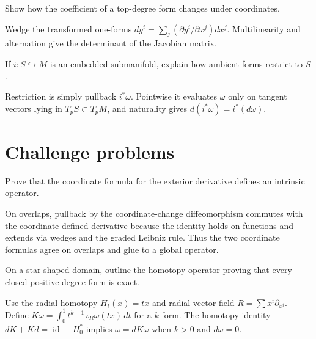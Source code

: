 \begin{problem}\label{prob:vii09-11}
Show how the coefficient of a top-degree form changes under coordinates.
\end{problem}
\begin{solution}
Wedge the transformed one-forms \(dy^i=\sum_j(\partial y^i/\partial x^j)dx^j\). Multilinearity and alternation give the determinant of the Jacobian matrix.
\end{solution}

\begin{problem}[Restriction]\label{prob:vii09-12}
If \(i:S\hookrightarrow M\) is an embedded submanifold, explain how ambient forms restrict to \(S\).
\end{problem}
\begin{solution}
Restriction is simply pullback \(i^*\omega\). Pointwise it evaluates \(\omega\) only on tangent vectors lying in \(T_pS\subset T_pM\), and naturality gives \(d(i^*\omega)=i^*(d\omega)\).
\end{solution}


\section{Challenge problems}

\begin{problem}\label{prob:vii09-ch01}
Prove that the coordinate formula for the exterior derivative defines an intrinsic operator.
\end{problem}
\begin{solution}
On overlaps, pullback by the coordinate-change diffeomorphism commutes with the coordinate-defined derivative because the identity holds on functions and extends via wedges and the graded Leibniz rule. Thus the two coordinate formulas agree on overlaps and glue to a global operator.
\end{solution}

\begin{problem}\label{prob:vii09-ch02}
On a star-shaped domain, outline the homotopy operator proving that every closed positive-degree form is exact.
\end{problem}
\begin{solution}
Use the radial homotopy \(H_t(x)=tx\) and radial vector field \(R=\sum x^i\partial_{x^i}\). Define \(K\omega=\int_0^1 t^{k-1}\,\iota_R\omega(tx)\,dt\) for a \(k\)-form. The homotopy identity \(dK+Kd=\operatorname{id}-H_0^*\) implies \(\omega=dK\omega\) when \(k>0\) and \(d\omega=0\).
\end{solution}

